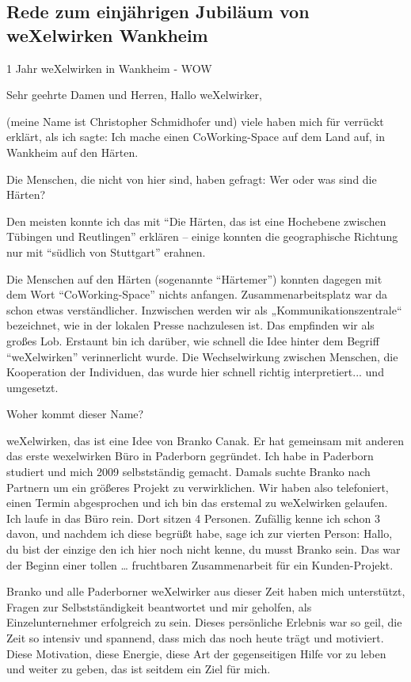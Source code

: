 \begin{appendix}
\chapter{Rede zum einjährigen Jubiläum von weXelwirken Wankheim}
1 Jahr weXelwirken in Wankheim - WOW

Sehr geehrte Damen und Herren, Hallo weXelwirker,

(meine Name ist Christopher Schmidhofer und) viele haben mich für verrückt erklärt, als ich sagte: Ich mache einen CoWorking-Space auf dem Land auf, in Wankheim auf den Härten.

Die Menschen, die nicht von hier sind, haben gefragt:
Wer oder was sind die Härten?

Den meisten konnte ich das mit "`Die Härten, das ist eine Hochebene zwischen Tübingen und Reutlingen"' erklären – einige konnten die geographische Richtung nur mit "`südlich von Stuttgart"' erahnen.

Die Menschen auf den Härten (sogenannte "`Härtemer"') konnten dagegen mit dem Wort "`CoWorking-Space"' nichts anfangen. Zusammenarbeitsplatz war da schon etwas verständlicher. Inzwischen werden wir als „Kommunikationszentrale“ bezeichnet, wie in der lokalen Presse nachzulesen ist. Das empfinden wir als großes Lob.
Erstaunt bin ich darüber, wie schnell die Idee hinter dem Begriff "`weXelwirken"' verinnerlicht wurde. Die Wechselwirkung zwischen Menschen, die Kooperation der Individuen, das wurde hier schnell richtig interpretiert... und umgesetzt.

Woher kommt dieser Name? 

weXelwirken, das ist eine Idee von Branko Canak. Er hat gemeinsam mit anderen das erste wexelwirken Büro in Paderborn gegründet. Ich habe in Paderborn studiert und mich 2009 selbstständig gemacht. Damals suchte Branko nach Partnern um ein größeres Projekt zu verwirklichen. Wir haben also telefoniert, einen Termin abgesprochen und ich bin das erstemal zu weXelwirken gelaufen. Ich laufe in das Büro rein. Dort sitzen 4 Personen. Zufällig kenne ich schon 3 davon, und nachdem ich diese begrüßt habe, sage ich zur vierten Person: Hallo, du bist der einzige den ich hier noch nicht kenne, du musst Branko sein. Das war der Beginn einer tollen … fruchtbaren Zusammenarbeit für ein Kunden-Projekt.

Branko und alle Paderborner weXelwirker aus dieser Zeit haben mich unterstützt, Fragen zur Selbstständigkeit beantwortet und mir geholfen, als Einzelunternehmer erfolgreich zu sein. Dieses persönliche Erlebnis war so        geil, die Zeit so intensiv und spannend, dass mich das noch heute trägt und motiviert. 
Diese Motivation, diese Energie, diese Art der gegenseitigen Hilfe vor zu leben und weiter zu geben, das ist seitdem ein Ziel für mich.


\end{appendix}
